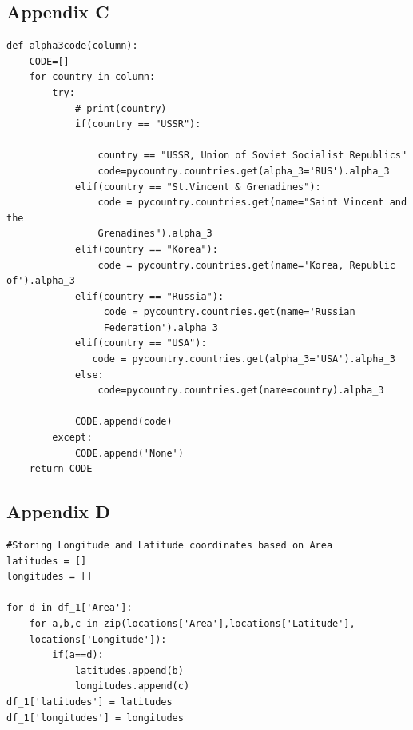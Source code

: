 \documentclass[12pt,a4paper]{article}
\begin{document}
\newpage
\subsection{Appendix C}

\begin{verbatim}
def alpha3code(column):
    CODE=[]
    for country in column:
        try:
            # print(country)
            if(country == "USSR"):
                
                country == "USSR, Union of Soviet Socialist Republics"
                code=pycountry.countries.get(alpha_3='RUS').alpha_3
            elif(country == "St.Vincent & Grenadines"):
                code = pycountry.countries.get(name="Saint Vincent and the 
                Grenadines").alpha_3
            elif(country == "Korea"):
                code = pycountry.countries.get(name='Korea, Republic of').alpha_3
            elif(country == "Russia"):
                 code = pycountry.countries.get(name='Russian 
                 Federation').alpha_3
            elif(country == "USA"):
               code = pycountry.countries.get(alpha_3='USA').alpha_3
            else:
                code=pycountry.countries.get(name=country).alpha_3

            CODE.append(code)
        except:
            CODE.append('None')
    return CODE
\end{verbatim}

\subsection{Appendix D}
\begin{verbatim}
#Storing Longitude and Latitude coordinates based on Area
latitudes = []
longitudes = []

for d in df_1['Area']:
    for a,b,c in zip(locations['Area'],locations['Latitude'],
    locations['Longitude']):
        if(a==d):
            latitudes.append(b)
            longitudes.append(c)
df_1['latitudes'] = latitudes
df_1['longitudes'] = longitudes
\end{verbatim}

\newpage
\end{document}
